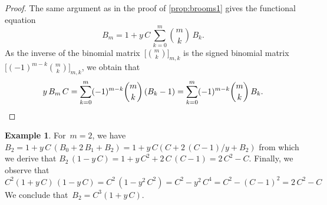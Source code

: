 \documentclass{amsart}
\theoremstyle{definition}
\newtheorem{example}[theorem]{Example}
\begin{document}
\begin{proof}
The same argument as in the proof of \cref{prop:brooms1} gives the functional equation
\[
B_m = 1 + y \, C \, \sum_{k = 0}^m \binom{m}{k} \, B_k.
\]
As the inverse of the binomial matrix~$\big[\binom{m}{k}\big]_{m,k}$ is the signed binomial matrix~$\big[(-1)^{m-k}\binom{m}{k}\big]_{m,k}$, we obtain that
\[
y \, B_m \, C = \sum_{k = 0}^m (-1)^{m-k} \binom{m}{k} \,(B_k - 1) = \sum_{k = 0}^m (-1)^{m-k} \binom{m}{k} \, B_k.
\qedhere
\]
\end{proof}

\begin{example}
For~$m = 2$, we have
\(
B_2 = 1 + y \, C \, (B_0 + 2  \, B_1 + B_2) = 1 + y \, C( C + 2 \, (C - 1) / y + B_2)
\)
from which we derive that
\(
B_2 \, (1 - y \, C) = 1 + y \, C^2 + 2 \, C \, (C - 1) = 2 \, C^2 - C. 
\)
Finally, we observe that
\(
C^2 (1+y \, C) \, ( 1 - y \, C) = C^2 \, (1 - y^2 \, C^2) = C^2 - y^2 \, C^4 = C^2 - (C - 1)^2 = 2 \, C^2 - C
\)
We conclude that~$B_2 = C^3 (1+y \, C)$.
\end{example}



\end{document}
